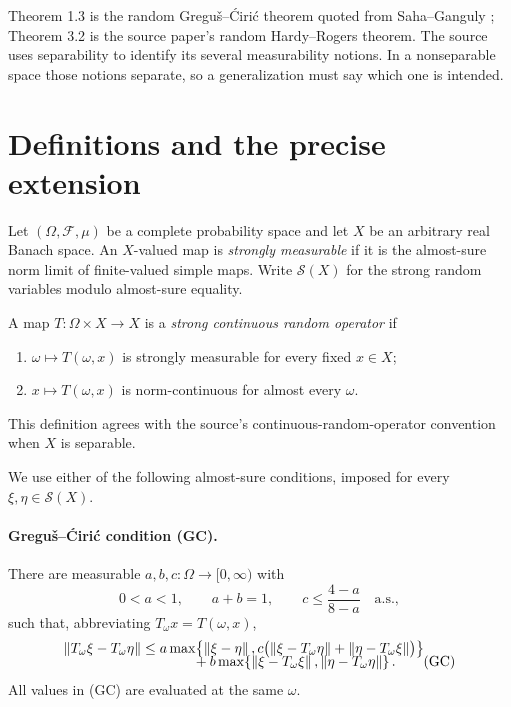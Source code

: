 \documentclass[11pt]{article}
\newcommand{\cS}{\mathcal S}
\newcommand{\norm}[1]{\left\lVert #1\right\rVert}
\begin{document}
Theorem 1.3 is the random Gregu\v{s}--\'{C}iri\'{c} theorem quoted from
Saha--Ganguly \cite{saha}; Theorem 3.2 is the source paper's random
Hardy--Rogers theorem.  The source uses separability to identify its several
measurability notions.  In a nonseparable space those notions separate, so a
generalization must say which one is intended.

\section{Definitions and the precise extension}

Let $(\Omega,\mathcal F,\mu)$ be a complete probability space and let $X$ be
an arbitrary real Banach space.  An $X$-valued map is \emph{strongly
measurable} if it is the almost-sure norm limit of finite-valued simple maps.
Write $\cS(X)$ for the strong random variables modulo almost-sure equality.

A map $T:\Omega\times X\to X$ is a \emph{strong continuous random operator}
if
\begin{enumerate}[label=(S\arabic*),leftmargin=2.6em]
\item $\omega\mapsto T(\omega,x)$ is strongly measurable for every fixed
      $x\in X$;
\item $x\mapsto T(\omega,x)$ is norm-continuous for almost every $\omega$.
\end{enumerate}
This definition agrees with the source's continuous-random-operator
convention when $X$ is separable.

We use either of the following almost-sure conditions, imposed for every
$\xi,\eta\in\cS(X)$.

\paragraph{Gregu\v{s}--\'{C}iri\'{c} condition (GC).}
There are measurable $a,b,c:\Omega\to[0,\infty)$ with
\[
 0<a<1,\qquad a+b=1,
 \qquad c\le \frac{4-a}{8-a}
 \quad\text{a.s.},
\]
such that, abbreviating $T_\omega x=T(\omega,x)$,
\begin{align}
 \norm{T_\omega\xi-T_\omega\eta}
 &\le a\max\!\left\{\norm{\xi-\eta},
 c\bigl(\norm{\xi-T_\omega\eta}+\norm{\eta-T_\omega\xi}\bigr)\right\}
 \notag\\[-2mm]
 &\hspace{13mm}+
 b\max\!\left\{\norm{\xi-T_\omega\xi},
                  \norm{\eta-T_\omega\eta}\right\}.
 \tag{GC}
\end{align}
All values in (GC) are evaluated at the same $\omega$.
\end{document}
